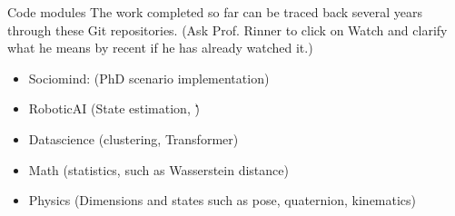 \begin{frame}[allowframebreaks]{Code modules}
    The work completed so far can be traced back several years through these Git repositories.
    (Ask Prof. Rinner to click on Watch and clarify what he means by recent if he has already watched it.)
    \begin{itemize}
        \item Sociomind: (PhD scenario implementation)
        \item RoboticAI (State estimation, \.\.\.)
        \item Datascience (clustering, Transformer)
        \item Math (statistics, such as Wasserstein distance)
        \item Physics (Dimensions and states such as pose, quaternion, kinematics)
    \end{itemize}
\end{frame}